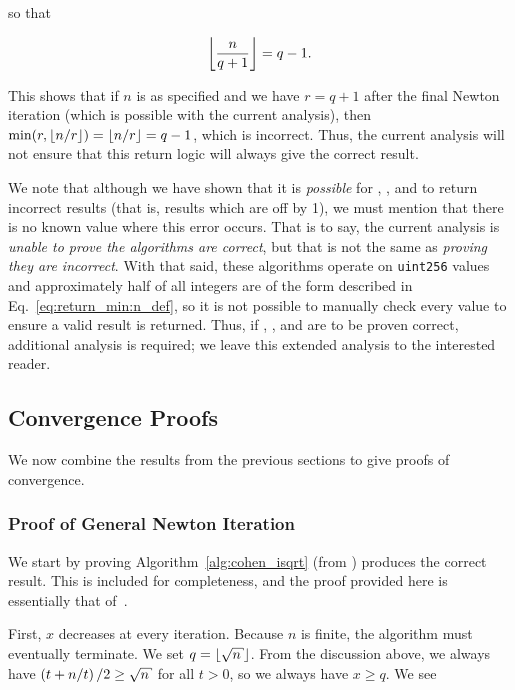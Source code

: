 \noindent
so that

\begin{equation}
    \left\lfloor \frac{n}{q+1} \right\rfloor = q-1.
\end{equation}

\noindent
This shows that if $n$ is as specified and we have $r=q+1$
after the final Newton iteration (which is possible with the current analysis),
then $\min(r, \left\lfloor n/r \right\rfloor) = \left\lfloor n/r \right\rfloor = q-1$, which is incorrect.
Thus, the current analysis will not ensure that this return logic
will always give the correct result.

We note that although we have shown that it is \emph{possible} for
\prb{}, \OpenZeppelin{}, and \abdk{}
to return incorrect results (that is, results which are off by 1),
we must mention that there is no known value where this error occurs.
That is to say, the current analysis is \emph{unable to prove
the algorithms are correct},
but that is not the same as \emph{proving they are incorrect}.
With that said, these algorithms operate on \texttt{uint256}
values and approximately half of all integers are of the form described
in Eq.~\eqref{eq:return_min:n_def},
so it is not possible to manually check every value
to ensure a valid result is returned.
Thus, if \prb{}, \OpenZeppelin{}, and \abdk{} are to be proven correct,
additional analysis is required;
we leave this extended analysis to the interested reader.


\subsection{Convergence Proofs}

We now combine the results from the previous sections
to give proofs of convergence.

\subsubsection{Proof of General Newton Iteration}
\label{proof:general_newton}

We start by proving Algorithm~\ref{alg:cohen_isqrt}
(from \cite[Algorithm 1.7.1]{cohen1993})
produces the correct result.
This is included for completeness,
and the proof provided here is essentially that
of~\cite[Algorithm 1.7.1, Proof]{cohen1993}.

First, $x$ decreases at every iteration.
Because $n$ is finite, the algorithm must eventually terminate.
We set $q = \floor{\sqrt{n}}$.
From the discussion above, we always have $\parens{t + n/t}/2 \ge \sqrt{n}$
for all $t > 0$,
so we always have $x\ge q$.
We see


